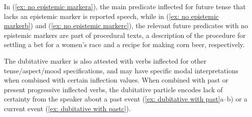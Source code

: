 In (\ref{ex: no epistemic markera}), the main predicate inflected for future tense that lacks an epistemic marker is reported speech, while in (\ref{ex: no epistemic markerb}) and (\ref{ex: no epistemic markerc}), the relevant future predicates with no epistemic markers are part of procedural texts, a description of the procedure for settling a bet for a women's race and a recipe for making corn beer, respectively.


The dubitative marker is also attested with verbs inflected for other tense\slash aspect\slash mood specifications, and may have specific modal interpretations when combined with certain inflection values. When combined with past or present progressive inflected verbs, the dubitative particle encodes lack of certainty from the speaker about a past event (\ref{ex: dubitative with past}a--b) or a current event (\ref{ex: dubitative with pastc}).

\ea\label{ex: dubitative with past}

    \label{ex: dubitative with pasta}
        \label{ex: dubitative with pastb}
            \label{ex: dubitative with pastc}
    \z
\z

